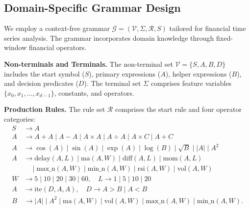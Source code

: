 \subsection{Domain-Specific Grammar Design}
\label{subsec:grammar}

We employ a context-free grammar $\mathcal{G} = (\mathcal{V}, \Sigma, \mathcal{R}, \mathit{S})$ tailored for financial time series analysis. The grammar incorporates domain knowledge through fixed-window financial operators.

\textbf{Non-terminals and Terminals.} The non-terminal set $\mathcal{V} = \{\mathit{S}, \mathit{A}, \mathit{B}, \mathit{D}\}$ includes the start symbol ($\mathit{S}$), primary expressions ($\mathit{A}$), helper expressions ($\mathit{B}$), and decision predicates ($\mathit{D}$). The terminal set $\Sigma$ comprises feature variables $\{x_0, x_1, \ldots, x_{d-1}\}$, constants, and operators.

\textbf{Production Rules.} The rule set $\mathcal{R}$ comprises the start rule and four operator categories:
\begin{align}
\mathit{S} &\rightarrow \mathit{A} \nonumber \\
\mathit{A} &\rightarrow \mathit{A} + \mathit{A} \mid \mathit{A} - \mathit{A} \mid \mathit{A} \times \mathit{A} \mid \mathit{A} \div \mathit{A} \mid \mathit{A} \times C \mid \mathit{A} + C \nonumber \\
\mathit{A} &\rightarrow \cos(\mathit{A}) \mid \sin(\mathit{A}) \mid \exp(\mathit{A}) \mid \log(\mathit{B}) \mid \sqrt{\mathit{B}} \mid |\mathit{A}| \mid \mathit{A}^{2} \nonumber \\
\mathit{A} &\rightarrow \text{delay}(\mathit{A}, \mathit{L}) \mid \text{ma}(\mathit{A}, \mathit{W}) \mid \text{diff}(\mathit{A}, \mathit{L}) \mid \text{mom}(\mathit{A}, \mathit{L}) \nonumber \\
&\quad \mid \text{max\_n}(\mathit{A}, \mathit{W}) \mid \text{min\_n}(\mathit{A}, \mathit{W}) \mid \text{rsi}(\mathit{A}, \mathit{W}) \mid \text{vol}(\mathit{A}, \mathit{W}) \nonumber \\
\mathit{W} &\rightarrow 5 \mid 10 \mid 20 \mid 30 \mid 60, \quad \mathit{L} \rightarrow 1 \mid 5 \mid 10 \mid 20 \nonumber \\
\mathit{A} &\rightarrow \text{ite}(\mathit{D}, \mathit{A}, \mathit{A}), \quad \mathit{D} \rightarrow \mathit{A} > \mathit{B} \mid \mathit{A} < \mathit{B} \nonumber \\
\mathit{B} &\rightarrow |\mathit{A}| \mid \mathit{A}^{2} \mid \text{ma}(\mathit{A}, \mathit{W}) \mid \text{vol}(\mathit{A}, \mathit{W}) \mid \text{max\_n}(\mathit{A}, \mathit{W}) \mid \text{min\_n}(\mathit{A}, \mathit{W}).
\end{align}

